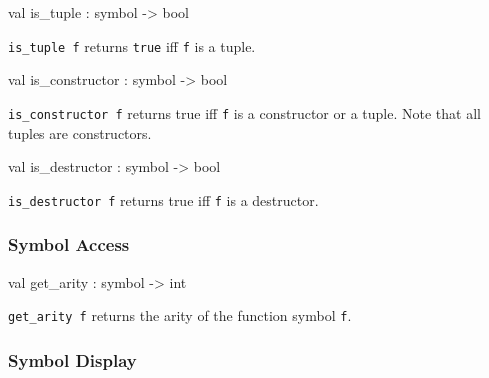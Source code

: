 \label{val:Term.is-underscoretuple}\begin{ocamldoccode}
val is_tuple : symbol -> bool
\end{ocamldoccode}
\begin{ocamldocdescription}
{\tt{is\_tuple f}} returns {\tt{true}} iff {\tt{f}} is a tuple.


\end{ocamldocdescription}




\label{val:Term.is-underscoreconstructor}\begin{ocamldoccode}
val is_constructor : symbol -> bool
\end{ocamldoccode}
\begin{ocamldocdescription}
{\tt{is\_constructor f}} returns true iff {\tt{f}} is a constructor or a tuple. Note that all tuples are constructors.


\end{ocamldocdescription}




\label{val:Term.is-underscoredestructor}\begin{ocamldoccode}
val is_destructor : symbol -> bool
\end{ocamldoccode}
\begin{ocamldocdescription}
{\tt{is\_destructor f}} returns true iff {\tt{f}} is a destructor.


\end{ocamldocdescription}




\subsubsection{Symbol Access}




\label{val:Term.get-underscorearity}\begin{ocamldoccode}
val get_arity : symbol -> int
\end{ocamldoccode}
\begin{ocamldocdescription}
{\tt{get\_arity f}} returns the arity of the function symbol {\tt{f}}.


\end{ocamldocdescription}




\subsubsection{Symbol Display}




